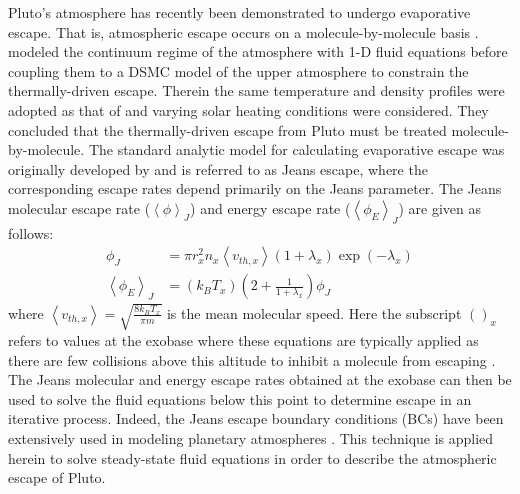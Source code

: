 \documentclass[times,12]{article}
\begin{document}
\indent Pluto's atmosphere has recently been demonstrated to undergo evaporative escape. That is, atmospheric escape occurs on a molecule-by-molecule basis \citep{Johnson2010, Volkov2011, Volkov2011a, Tucker2012, Erwin2013}. \cite{Tucker2012} modeled the continuum regime of the atmosphere with 1-D fluid equations before coupling them to a DSMC model of the upper atmosphere to constrain the thermally-driven escape. Therein the same temperature and density profiles were adopted as that of \cite{Strobel2008} and varying solar heating conditions were considered. They concluded that the thermally-driven escape from Pluto must be treated molecule-by-molecule. The standard analytic model for calculating evaporative escape was originally developed by \cite{Jeans1925} and is referred to as Jeans escape, where the corresponding escape rates depend primarily on the Jeans parameter. The Jeans molecular escape rate ($\left\langle \phi \right\rangle_J$) and energy escape rate ($\left\langle \phi_E \right\rangle_J$) are given as follows:
\begin{align}
\phi_J &= \pi r_x^2 n_x \left\langle v_{th,x} \right\rangle (1 + \lambda_x) \exp (-\lambda_x) \label{eq:Jeans1}\\
\left\langle \phi_E \right\rangle_J &= (k_B T_x) \left( 2 + \frac{1}{1 + \lambda_x} \right) \phi_J
\label{eq:Jeans2}
\end{align}
\noindent where $\left\langle v_{th,x} \right\rangle = \sqrt{\frac{8 k_B T_x}{\pi m}}$ is the mean molecular speed. Here the subscript $()_x$ refers to values at the exobase where these equations are typically applied as there are few collisions above this altitude to inhibit a molecule from escaping \citep{Erwin2013}. The Jeans molecular and energy escape rates obtained at the exobase can then be used to solve the fluid equations below this point to determine escape in an iterative process. Indeed, the Jeans escape boundary conditions (BCs) have been extensively used in modeling planetary atmospheres \citep{Chassefiere1996, Yelle2004, Tian2008, Erwin2013, Johnson2015}. This technique is applied herein to solve steady-state fluid equations in order to describe the atmospheric escape of Pluto.
\end{document}
